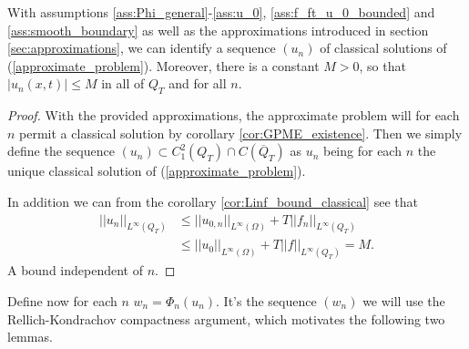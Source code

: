 \documentclass[11pt, a4paper]{article}
\begin{document}
\begin{lemma}
\label{prop:classical_sols_seq}
With assumptions \ref{ass:Phi_general}-\ref{ass:u_0}, \ref{ass:f_ft_u_0_bounded} and \ref{ass:smooth_boundary} as well as the approximations introduced in section \ref{sec:approximations}, we can identify a sequence $(u_n)$ of classical solutions of (\ref{approximate_problem}). Moreover, there is a constant $M>0$, so that $|u_n(x,t)| \leq M$ in all of $Q_T$ and for all $n$.
\end{lemma}

\begin{proof}
With the provided approximations, the approximate problem 
will for each $n$ permit a classical solution by corollary \ref{cor:GPME_existence}. Then we simply define the sequence $(u_n) \subset C^2_1(Q_T)\cap C(\overline{Q}_T)$ as $u_n$ being for each $n$ the unique classical solution of (\ref{approximate_problem}).

In addition we can from the corollary   \ref{cor:Linf_bound_classical} see that
	\begin{align*}
	||u_n||_{L^\infty(Q_T)} &\leq ||u_{0,n}||_{L^\infty(\Omega)} + T||f_n||_{L^\infty(Q_T)} \\
	&\leq ||u_0||_{L^\infty(\Omega)} + T||f||_{L^\infty(Q_T)} = M.
	\end{align*}
	A bound independent of $n$.  	
\end{proof}

Define now for each $n$ $w_n = \Phi_n(u_n)$. It's the sequence $(w_n)$ we will use the Rellich-Kondrachov compactness argument, which motivates the following two lemmas.
\end{document}

